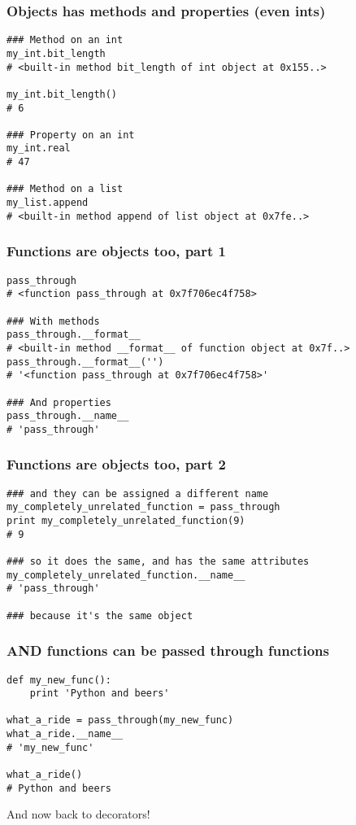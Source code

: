 \documentclass{beamer}
\begin{document}
\begin{frame}[fragile]
  \frametitle{Objects has methods and properties (even ints)}
\begin{verbatim}
### Method on an int
my_int.bit_length
# <built-in method bit_length of int object at 0x155..>

my_int.bit_length()
# 6

### Property on an int
my_int.real
# 47

### Method on a list
my_list.append
# <built-in method append of list object at 0x7fe..>
\end{verbatim}
\end{frame}

\begin{frame}[fragile]
  \frametitle{Functions are objects too, part 1}
\begin{verbatim}
pass_through
# <function pass_through at 0x7f706ec4f758>

### With methods
pass_through.__format__
# <built-in method __format__ of function object at 0x7f..>
pass_through.__format__('')
# '<function pass_through at 0x7f706ec4f758>'

### And properties
pass_through.__name__
# 'pass_through'
\end{verbatim}
\end{frame}

\begin{frame}[fragile]
  \frametitle{Functions are objects too, part 2}
\begin{verbatim}
### and they can be assigned a different name
my_completely_unrelated_function = pass_through
print my_completely_unrelated_function(9)
# 9

### so it does the same, and has the same attributes
my_completely_unrelated_function.__name__
# 'pass_through'

### because it's the same object
\end{verbatim}
\end{frame}

\begin{frame}[fragile]
  \frametitle{AND functions can be passed through functions}
\begin{verbatim}
def my_new_func():
    print 'Python and beers'

what_a_ride = pass_through(my_new_func)
what_a_ride.__name__
# 'my_new_func'

what_a_ride()
# Python and beers
\end{verbatim}
\begin{block}{\vspace*{-3ex}}
  And now back to decorators!  
\end{block}
\end{frame}
\end{document}

